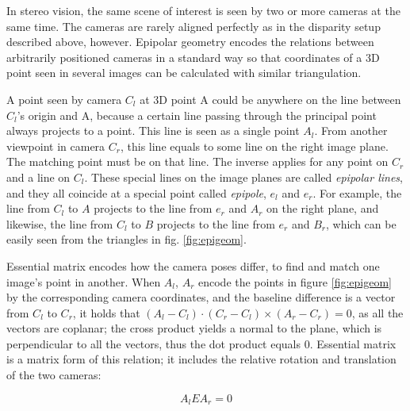 In stereo vision, the same scene of interest is seen by two or more cameras at the same time.
The cameras are rarely aligned perfectly as in the disparity setup described above, however.
Epipolar geometry encodes the relations between arbitrarily positioned cameras in a standard way so that coordinates of a 3D point seen in several images can be calculated with similar triangulation.

A point seen by camera $C_l$ at 3D point A could be anywhere on the line between $C_l$'s origin and A, because a certain line passing through the principal point always projects to a point.
This line is seen as a single point $A_l$.
From another viewpoint in camera $C_r$, this line equals to some line on the right image plane.
The matching point must be on that line.
The inverse applies for any point on $C_r$ and a line on $C_l$.
These special lines on the image planes are called \emph{epipolar lines}, and they all coincide at a special point called \emph{epipole}, $e_l$ and $e_r$.
For example, the line from $C_l$ to $A$ projects to the line from $e_r$ and $A_r$ on the right plane, and likewise, the line from $C_l$ to $B$ projects to the line from $e_r$ and $B_r$, which can be easily seen from the triangles in fig. \ref{fig:epigeom}.

Essential matrix encodes how the camera poses differ, to find and match one image's point in another.
When $A_l$, $A_r$ encode the points in figure \ref{fig:epigeom} by the corresponding camera coordinates, and the baseline difference is a vector from $C_l$ to $C_r$, it holds that $(A_l-C_l) \cdot (C_r - C_l) \times (A_r-C_r) = 0$, as all the vectors are coplanar; the cross product yields a normal to the plane, which is perpendicular to all the vectors, thus the dot product equals 0.
\cite{hartley03multiview}
Essential matrix is a matrix form of this relation; it includes the relative rotation and translation of the two cameras:

\begin{equation} \label{eq:essential}
	A_l E A_r = 0
\end{equation}


